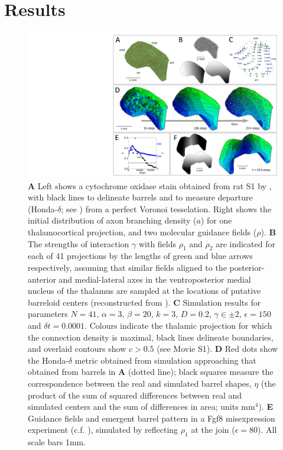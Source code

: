\documentclass[9pt,twocolumn,twoside,lineno]{pnas-new}
\begin{document}
\section*{Results}

\begin{figure}
\begin{center}
\includegraphics[width=17.8cm]{./MainFig.png}
\end{center}
\caption{\textbf{A} Left shows a cytochrome oxidase stain obtained from rat S1 by \cite{zheng_signal_2001}, with black lines to delineate barrels and to measure departure (Honda-$\delta$; see \cite{senft_mouse_1991}) from a perfect Voronoi tesselation. Right shows the initial distribution of axon branching density ($a$) for one thalamocortical projection, and two molecular guidance fields ($\rho$). \textbf{B} The strengths of interaction $\gamma$ with fields $\rho_1$ and $\rho_2$ are indicated for each of 41 projections by the lengths of green and blue arrows respectively, assuming that similar fields aligned to the posterior-anterior and medial-lateral axes in the ventroposterior medial nucleus of the thalamus are sampled at the locations of putative barreloid centers (reconstructed from \cite{haidarliu_size_2001}). \textbf{C} Simulation results for parameters $N=41$, $\alpha=3$, $\beta=20$, $k=3$, $D=0.2$, $\gamma\in\pm 2$, $\epsilon=150$ and $\delta{t}=0.0001$. Colours indicate the thalamic projection for which the connection density is maximal, black lines delineate boundaries, and overlaid contours show $c>0.5$ (see Movie S1). \textbf{D} Red dots show the Honda-$\delta$ metric obtained from simulation approaching that obtained from barrels in \textbf{A} (dotted line);  black squares measure the correspondence between the real and simulated barrel shapes, $\eta$ (the product of the sum of squared differences between real and simulated centers and the sum of differences in area; units mm$^4$). \textbf{E} Guidance fields and emergent barrel pattern in a Fgf8 misexpression experiment (c.f. \cite{assimacopoulos_fibroblast_2012}), simulated by reflecting $\rho_1$ at the join ($\epsilon=80$). All scale bars 1mm.}
\label{fig:main}
\end{figure}
\end{document}
